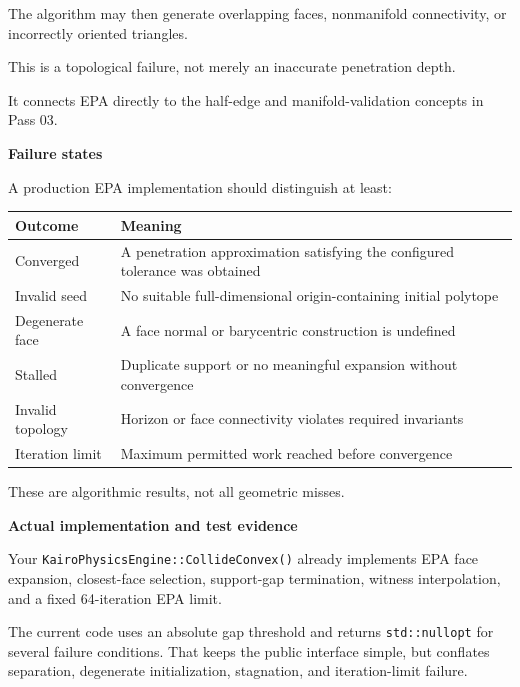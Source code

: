 The algorithm may then generate overlapping faces, nonmanifold connectivity, or incorrectly oriented triangles.

This is a topological failure, not merely an inaccurate penetration depth.

It connects EPA directly to the half-edge and manifold-validation concepts in Pass 03.

\textbf{Failure states}

A production EPA implementation should distinguish at least:

{\def\LTcaptype{none} %
\begin{longtable}[]{@{}
  >{\raggedright\arraybackslash}p{}
  >{\raggedright\arraybackslash}p{}@{}}
\toprule\noalign{}
\begin{minipage}[b]{\linewidth}\raggedright
Outcome
\end{minipage} & \begin{minipage}[b]{\linewidth}\raggedright
Meaning
\end{minipage} \\
\midrule\noalign{}
\endhead
\bottomrule\noalign{}
\endlastfoot
Converged & A penetration approximation satisfying the configured tolerance was obtained \\
Invalid seed & No suitable full-dimensional origin-containing initial polytope \\
Degenerate face & A face normal or barycentric construction is undefined \\
Stalled & Duplicate support or no meaningful expansion without convergence \\
Invalid topology & Horizon or face connectivity violates required invariants \\
Iteration limit & Maximum permitted work reached before convergence \\
\end{longtable}
}

These are algorithmic results, not all geometric misses.

\textbf{Actual implementation and test evidence}

Your \texttt{KairoPhysicsEngine::CollideConvex()} already implements EPA face expansion, closest-face selection, support-gap termination, witness interpolation, and a fixed 64-iteration EPA limit.

The current code uses an absolute gap threshold and returns \texttt{std::nullopt} for several failure conditions. That keeps the public interface simple, but conflates separation, degenerate initialization, stagnation, and iteration-limit failure.

